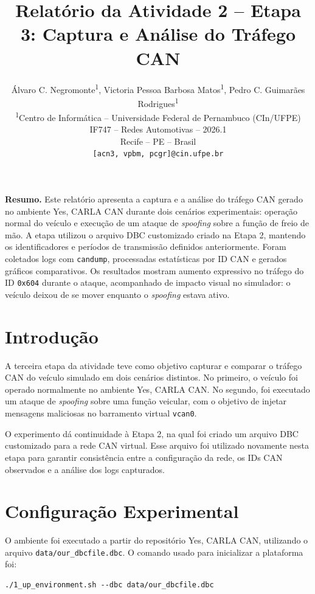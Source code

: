 \documentclass[12pt,a4paper]{article}
\title{\textbf{Relat\'orio da Atividade 2 -- Etapa 3: Captura e An\'alise do Tr\'afego CAN}}
\author{
\'Alvaro C. Negromonte\textsuperscript{1},
Victoria Pessoa Barbosa Matos\textsuperscript{1},
Pedro C. Guimar\~aes Rodrigues\textsuperscript{1}
\\[0.3cm]
\textsuperscript{1}Centro de Inform\'atica -- Universidade Federal de Pernambuco (CIn/UFPE)
\\
IF747 -- Redes Automotivas -- 2026.1
\\
Recife -- PE -- Brasil
\\
\texttt{[acn3, vpbm, pcgr]@cin.ufpe.br}
}
\date{}
\begin{document}
\maketitle

\noindent\textbf{Resumo.}
Este relat\'orio apresenta a captura e a an\'alise do tr\'afego CAN gerado no ambiente
Yes, CARLA CAN durante dois cen\'arios experimentais: opera\c{c}\~ao normal do
ve\'iculo e execu\c{c}\~ao de um ataque de \textit{spoofing} sobre a fun\c{c}\~ao de freio de
m\~ao. A etapa utilizou o arquivo DBC customizado criado na Etapa 2, mantendo os
identificadores e per\'iodos de transmiss\~ao definidos anteriormente. Foram coletados
logs com \texttt{candump}, processadas estat\'isticas por ID CAN e gerados gr\'aficos
comparativos. Os resultados mostram aumento expressivo no tr\'afego do ID \texttt{0x604}
durante o ataque, acompanhado de impacto visual no simulador: o ve\'iculo deixou de
se mover enquanto o \textit{spoofing} estava ativo.

\section{Introdu\c{c}\~ao}

A terceira etapa da atividade teve como objetivo capturar e comparar o tr\'afego CAN
do ve\'iculo simulado em dois cen\'arios distintos. No primeiro, o ve\'iculo foi operado
normalmente no ambiente Yes, CARLA CAN. No segundo, foi executado um ataque de
\textit{spoofing} sobre uma fun\c{c}\~ao veicular, com o objetivo de injetar mensagens
maliciosas no barramento virtual \texttt{vcan0}.

O experimento d\'a continuidade \`a Etapa 2, na qual foi criado um arquivo DBC
customizado para a rede CAN virtual. Esse arquivo foi utilizado novamente nesta etapa
para garantir consist\^encia entre a configura\c{c}\~ao da rede, os IDs CAN observados e a
an\'alise dos logs capturados.

\section{Configura\c{c}\~ao Experimental}

O ambiente foi executado a partir do reposit\'orio Yes, CARLA CAN, utilizando o
arquivo \texttt{data/our\_dbcfile.dbc}. O comando usado para inicializar a plataforma foi:

\begin{verbatim}
./1_up_environment.sh --dbc data/our_dbcfile.dbc
\end{verbatim}
\end{document}
